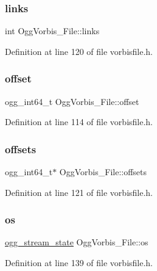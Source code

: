 \subsubsection{\texorpdfstring{links}{links}}
{\footnotesize\ttfamily int Ogg\+Vorbis\+\_\+\+File\+::links}



Definition at line 120 of file vorbisfile.\+h.

\mbox{\label{struct_ogg_vorbis___file_a36f8f9f012cd2e7ab8cb395b787376cb}} 
\subsubsection{\texorpdfstring{offset}{offset}}
{\footnotesize\ttfamily ogg\+\_\+int64\+\_\+t Ogg\+Vorbis\+\_\+\+File\+::offset}



Definition at line 114 of file vorbisfile.\+h.

\mbox{\label{struct_ogg_vorbis___file_af9fe0ece4ff98e207682731b36951920}} 
\subsubsection{\texorpdfstring{offsets}{offsets}}
{\footnotesize\ttfamily ogg\+\_\+int64\+\_\+t$\ast$ Ogg\+Vorbis\+\_\+\+File\+::offsets}



Definition at line 121 of file vorbisfile.\+h.

\mbox{\label{struct_ogg_vorbis___file_a8658f17a6f662a74f8763c47d560d712}} 
\subsubsection{\texorpdfstring{os}{os}}
{\footnotesize\ttfamily \mbox{\hyperlink{structogg__stream__state}{ogg\+\_\+stream\+\_\+state}} Ogg\+Vorbis\+\_\+\+File\+::os}



Definition at line 139 of file vorbisfile.\+h.

